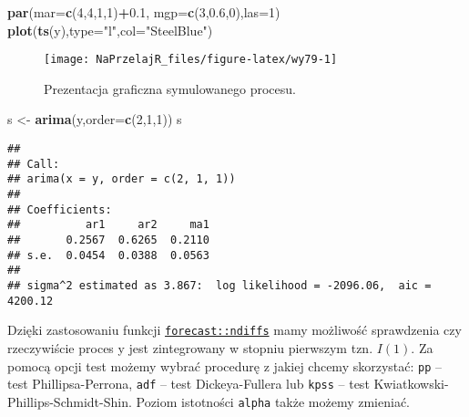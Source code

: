 \documentclass[polish,]{book}
\newenvironment{Shaded}{\begin{snugshade}}{\end{snugshade}}
\newcommand{\DataTypeTok}[1]{\textcolor[rgb]{0.13,0.29,0.53}{#1}}
\newcommand{\DecValTok}[1]{\textcolor[rgb]{0.00,0.00,0.81}{#1}}
\newcommand{\FloatTok}[1]{\textcolor[rgb]{0.00,0.00,0.81}{#1}}
\newcommand{\KeywordTok}[1]{\textcolor[rgb]{0.13,0.29,0.53}{\textbf{#1}}}
\newcommand{\NormalTok}[1]{#1}
\newcommand{\OperatorTok}[1]{\textcolor[rgb]{0.81,0.36,0.00}{\textbf{#1}}}
\newcommand{\StringTok}[1]{\textcolor[rgb]{0.31,0.60,0.02}{#1}}
\begin{document}
\begin{Shaded}
\begin{Highlighting}[]
\KeywordTok{par}\NormalTok{(}\DataTypeTok{mar=}\KeywordTok{c}\NormalTok{(}\DecValTok{4}\NormalTok{,}\DecValTok{4}\NormalTok{,}\DecValTok{1}\NormalTok{,}\DecValTok{1}\NormalTok{)}\OperatorTok{+}\FloatTok{0.1}\NormalTok{, }\DataTypeTok{mgp=}\KeywordTok{c}\NormalTok{(}\DecValTok{3}\NormalTok{,}\FloatTok{0.6}\NormalTok{,}\DecValTok{0}\NormalTok{),}\DataTypeTok{las=}\DecValTok{1}\NormalTok{)}
\KeywordTok{plot}\NormalTok{(}\KeywordTok{ts}\NormalTok{(y),}\DataTypeTok{type=}\StringTok{"l"}\NormalTok{,}\DataTypeTok{col=}\StringTok{"SteelBlue"}\NormalTok{)}
\end{Highlighting}
\end{Shaded}

\begin{figure}[h]

{\centering \texttt{[image: NaPrzelajR\_files/figure-latex/wy79-1]} 

}

\caption{Prezentacja graficzna symulowanego procesu.}\label{fig:wy79}
\end{figure}

\begin{Shaded}
\begin{Highlighting}[]
\NormalTok{s <-}\StringTok{ }\KeywordTok{arima}\NormalTok{(y,}\DataTypeTok{order=}\KeywordTok{c}\NormalTok{(}\DecValTok{2}\NormalTok{,}\DecValTok{1}\NormalTok{,}\DecValTok{1}\NormalTok{))}
\NormalTok{s}
\end{Highlighting}
\end{Shaded}

\begin{verbatim}
## 
## Call:
## arima(x = y, order = c(2, 1, 1))
## 
## Coefficients:
##          ar1     ar2     ma1
##       0.2567  0.6265  0.2110
## s.e.  0.0454  0.0388  0.0563
## 
## sigma^2 estimated as 3.867:  log likelihood = -2096.06,  aic = 4200.12
\end{verbatim}

Dzięki zastosowaniu funkcji \href{https://rdrr.io/cran/forecast/man/ndiffs.html}{\texttt{forecast::ndiffs}} mamy możliwość sprawdzenia czy rzeczywiście proces y jest zintegrowany w stopniu pierwszym tzn. \(I(1)\). Za pomocą opcji test możemy wybrać procedurę z jakiej chcemy skorzystać: \texttt{pp} -- test Phillipsa-Perrona, \texttt{adf} -- test Dickeya-Fullera lub \texttt{kpss} -- test Kwiatkowski-Phillips-Schmidt-Shin. Poziom istotności \texttt{alpha} także możemy zmieniać.
\end{document}
